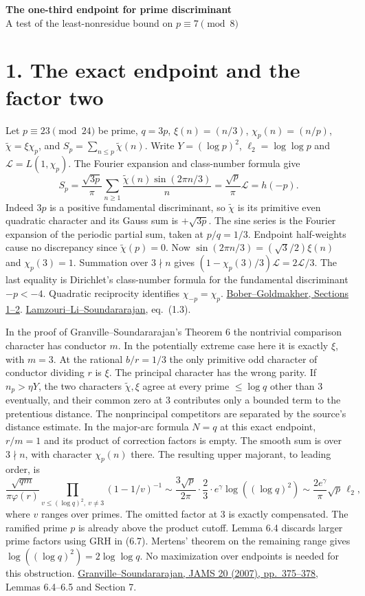 \documentclass[11pt]{article}
\newcommand{\LL}{\mathcal L}
\newcommand{\ch}{\chi_p}
\newcommand{\tw}{\widetilde\chi}
\newcommand{\gs}{\href{https://dms.umontreal.ca/~andrew/PDF/pretentious.pdf}{Granville--Soundararajan, JAMS 20 (2007), pp.\ 375--378}}
\newcommand{\lls}{\href{https://arxiv.org/pdf/1309.3595}{Lamzouri--Li--Soundararajan}}
\begin{document}
{\Large\bfseries The one-third endpoint for prime discriminant}\\[3pt]
{\large A test of the least-nonresidue bound on $p\equiv 7\pmod 8$}

\section*{1. The exact endpoint and the factor two}
Let $p\equiv23\pmod{24}$ be prime, $q=3p$, $\xi(n)=(n/3)$, $\ch(n)=(n/p)$, $\tw=\xi\ch$, and $S_p=\sum_{n\le p}\tw(n)$. Write $Y=(\log p)^2$, $\ell_2=\log\log p$ and $\LL=L(1,\ch)$. The Fourier expansion and class-number formula give
\begin{equation}
 S_p=\frac{\sqrt{3p}}{\pi}\sum_{n\ge1}\frac{\tw(n)\sin(2\pi n/3)}{n}
 =\frac{\sqrt p}{\pi}\LL=h(-p).
\end{equation}
Indeed $3p$ is a positive fundamental discriminant, so $\tw$ is its primitive even quadratic character and its Gauss sum is $+\sqrt{3p}$. The sine series is the Fourier expansion of the periodic partial sum, taken at $p/q=1/3$. Endpoint half-weights cause no discrepancy since $\tw(p)=0$. Now $\sin(2\pi n/3)=(\sqrt3/2)\xi(n)$ and $\ch(3)=1$. Summation over $3\nmid n$ gives $(1-\ch(3)/3)\LL=2\LL/3$. The last equality is Dirichlet's class-number formula for the fundamental discriminant $-p<-4$. Quadratic reciprocity identifies $\chi_{-p}=\ch$. \href{https://arxiv.org/pdf/1311.7556}{Bober--Goldmakher, Sections 1--2}. \lls, eq.\ (1.3).

In the proof of Granville--Soundararajan's Theorem 6 the nontrivial comparison character has conductor $m$. In the potentially extreme case here it is exactly $\xi$, with $m=3$. At the rational $b/r=1/3$ the only primitive odd character of conductor dividing $r$ is $\xi$. The principal character has the wrong parity. If $n_p>\eta Y$, the two characters $\tw,\xi$ agree at every prime $\le\log q$ other than $3$ eventually, and their common zero at $3$ contributes only a bounded term to the pretentious distance. The nonprincipal competitors are separated by the source's distance estimate. In the major-arc formula $N=q$ at this exact endpoint, $r/m=1$ and its product of correction factors is empty. The smooth sum is over $3\nmid n$, with character $\ch(n)$ there. The resulting upper majorant, to leading order, is
\[
 \frac{\sqrt{qm}}{\pi\varphi(r)}
       \prod_{v\le(\log q)^2,\ v\ne3}(1-1/v)^{-1}
 \sim\frac{3\sqrt p}{2\pi}\cdot\frac23\cdot e^\gamma\log((\log q)^2)
 \sim\frac{2e^\gamma}{\pi}\sqrt p\,\ell_2 ,
\]
where $v$ ranges over primes. The omitted factor at $3$ is exactly compensated. The ramified prime $p$ is already above the product cutoff. Lemma 6.4 discards larger prime factors using GRH in (6.7). Mertens' theorem on the remaining range gives $\log((\log q)^2)=2\log\log q$. No maximization over endpoints is needed for this obstruction. \gs, Lemmas 6.4--6.5 and Section 7.
\end{document}
